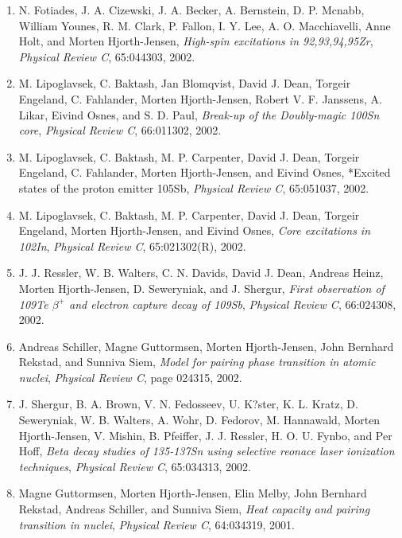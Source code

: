 \documentclass[%
oneside,                 %
final,                   %
10pt]{article}
\begin{document}
\begin{enumerate}
\item N. Fotiades, J. A. Cizewski, J. A. Becker, A. Bernstein, D. P. Mcnabb, William   Younes, R. M. Clark, P. Fallon, I. Y. Lee, A. O. Macchiavelli, Anne Holt, and   Morten Hjorth-Jensen, \emph{High-spin excitations in 92,93,94,95Zr}, \emph{Physical Review C}, 65:044303, 2002. 

\item M. Lipoglavsek, C. Baktash, Jan Blomqvist, David J. Dean, Torgeir Engeland,   C. Fahlander, Morten Hjorth-Jensen, Robert V. F. Janssens, A. Likar, Eivind   Osnes, and S. D. Paul, \emph{Break-up of the Doubly-magic 100Sn core},  \emph{Physical Review C}, 66:011302, 2002. 

\item M. Lipoglavsek, C. Baktash, M. P. Carpenter, David J. Dean, Torgeir Engeland,   C. Fahlander, Morten Hjorth-Jensen, and Eivind Osnes, *Excited states of the proton emitter 105Sb, \emph{Physical Review C}, 65:051037, 2002. 

\item M. Lipoglavsek, C. Baktash, M. P. Carpenter, David J. Dean, Torgeir Engeland,   Morten Hjorth-Jensen, and Eivind Osnes, \emph{Core excitations in 102In},  \emph{Physical Review C}, 65:021302(R), 2002. 

\item J. J. Ressler, W. B. Walters, C. N. Davids, David J. Dean, Andreas Heinz,   Morten Hjorth-Jensen, D. Seweryniak, and J. Shergur, \emph{First observation of 109Te $\beta^+$ and electron capture  decay of 109Sb},  \emph{Physical Review C}, 66:024308, 2002. 

\item Andreas Schiller, Magne Guttormsen, Morten Hjorth-Jensen, John Bernhard   Rekstad, and Sunniva Siem, \emph{Model for pairing phase transition in atomic nuclei},   \emph{Physical Review C}, page 024315, 2002. 

\item J. Shergur, B. A. Brown, V. N. Fedosseev, U. K?ster, K. L. Kratz,   D. Seweryniak, W. B. Walters, A. Wohr, D. Fedorov, M. Hannawald, Morten   Hjorth-Jensen, V. Mishin, B. Pfeiffer, J. J. Ressler, H. O. U. Fynbo, and Per   Hoff, \emph{Beta decay studies of 135-137Sn using selective reonace   laser ionization techniques}, \emph{Physical Review C}, 65:034313, 2002. 

\item Magne Guttormsen, Morten Hjorth-Jensen, Elin Melby, John Bernhard Rekstad,   Andreas Schiller, and Sunniva Siem, \emph{Heat capacity and pairing transition in nuclei},  \emph{Physical Review C}, 64:034319, 2001. 


\end{enumerate}
\end{document}
